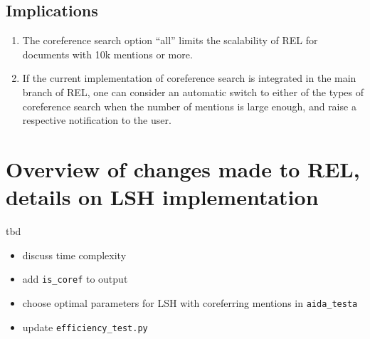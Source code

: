 \documentclass[a4paper,11pt]{article}
\numberwithin{equation}{section} %
\begin{document}
\subsection{Implications}

\begin{enumerate}
 \item The coreference search option ``all'' limits the scalability of REL for documents with 10k mentions or more.
 \item If the current implementation of coreference search is integrated in the main branch of REL, one can consider an automatic switch to either of the types of coreference search when the number of mentions is large enough, and raise a respective notification to the user. 
\end{enumerate}


\section{Overview of changes made to REL, details on LSH implementation}
tbd 

\begin{itemize}
 \item discuss time complexity 
 \item add \verb|is_coref| to output 
 \item choose optimal parameters for LSH with coreferring mentions in \verb|aida_testa|
 \item update \verb|efficiency_test.py|
\end{itemize}



\end{document}
